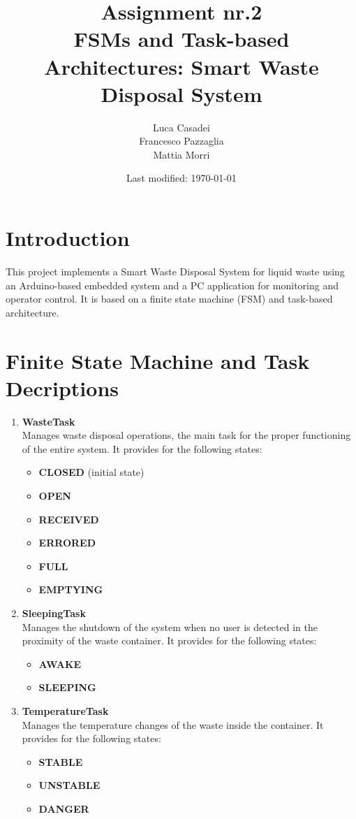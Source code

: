 \documentclass[a4paper]{article}
\author{Luca Casadei\\Francesco Pazzaglia\\Mattia Morri}
\date{Last modified: \today}
\title{\textbf{Assignment nr.2\\FSMs and Task-based Architectures: Smart Waste Disposal System}}
\begin{document}
	\maketitle
	\tableofcontents
	\section{Introduction}
	This project implements a Smart Waste Disposal System for liquid waste using an Arduino-based embedded system and a PC application for monitoring and operator control. It is based on a finite state machine (FSM) and task-based architecture.
	
	\section{Finite State Machine and Task Decriptions}
	\begin{enumerate}
		\item \textbf{WasteTask}\\
		Manages waste disposal operations, the main task for the proper functioning of the entire system. It provides for the following states:
		\begin{itemize}
			\item \textbf{CLOSED} (initial state)
			\item \textbf{OPEN}
			\item \textbf{RECEIVED}
			\item \textbf{ERRORED}
			\item \textbf{FULL}
			\item \textbf{EMPTYING}
		\end{itemize}
		
		\item \textbf{SleepingTask}\\
		Manages the shutdown of the system when no user is detected in the proximity of the waste container. It provides for the following states:
		\begin{itemize}
			\item \textbf{AWAKE}
			\item \textbf{SLEEPING}
		\end{itemize}
		
		\item \textbf{TemperatureTask}\\
		Manages the temperature changes of the waste inside the container. It provides for the following states:
				\begin{itemize}
			\item \textbf{STABLE}
			\item \textbf{UNSTABLE}
			\item \textbf{DANGER}
		\end{itemize}
	\end{enumerate}
\end{document}
